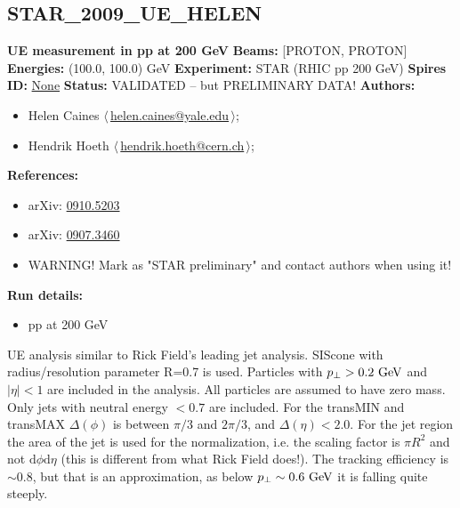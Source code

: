 \subsection{STAR\_2009\_UE\_HELEN}
\textbf{UE measurement in pp at 200 GeV}\newline
\textbf{Beams:} [PROTON, PROTON] \newline
\textbf{Energies:} (100.0, 100.0) GeV \newline
\textbf{Experiment:} STAR (RHIC pp 200 GeV) \newline
\textbf{Spires ID:} \href{http://www.slac.stanford.edu/spires/find/hep/www?rawcmd=key+None}{None}\newline
\textbf{Status:} VALIDATED -- but PRELIMINARY DATA!\newline
\textbf{Authors:}
\begin{itemize}
  \item Helen Caines $\langle\,$\href{mailto:helen.caines@yale.edu}{helen.caines@yale.edu}$\,\rangle$;
  \item Hendrik Hoeth $\langle\,$\href{mailto:hendrik.hoeth@cern.ch}{hendrik.hoeth@cern.ch}$\,\rangle$;
\end{itemize}
\textbf{References:}
\begin{itemize}
  \item arXiv: \href{http://arxiv.org/abs/0910.5203}{0910.5203}
  \item arXiv: \href{http://arxiv.org/abs/0907.3460}{0907.3460}
  \item WARNING! Mark as "STAR preliminary" and contact authors when using it!
\end{itemize}
\textbf{Run details:}
\begin{itemize}

  \item pp at 200 GeV\end{itemize}

\noindent UE analysis similar to Rick Field's leading jet analysis. SIScone with radius/resolution parameter R=0.7 is used. Particles with $p_\perp > 0.2~\text{GeV}$ and $|\eta| < 1$ are included in the analysis. All particles are assumed to have zero mass. Only jets with neutral energy $< 0.7$ are included. For the transMIN and transMAX $\Delta(\phi)$ is between $\pi/3$ and $2\pi/3$, and $\Delta(\eta) < 2.0$. For the jet region the area of the jet is used for the normalization, i.e. the scaling factor is $\pi R^2$ and not $\mathrm{d}\phi\mathrm{d}\eta$ (this is different from what Rick Field does!). The tracking efficiency is $\sim 0.8$, but that is an approximation, as below $p_\perp \sim 0.6~\text{GeV}$ it is falling quite steeply.

